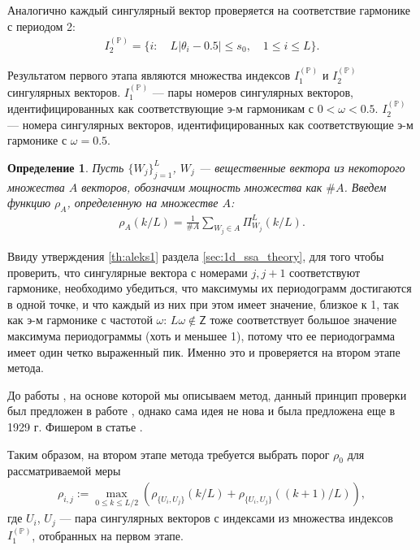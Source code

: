 \documentclass[specialist,
               substylefile = spbu.rtx,
               subf,href,colorlinks=true, 12pt]{disser}
\newtheorem{defn}{Определение}
\begin{document}
Аналогично каждый сингулярный вектор проверяется на соответствие гармонике с периодом 2:
\begin{gather} \label{eq:I_2_P}
I_2^{(\mathbb{P})} = \{i: \quad  L |\theta_{i} - 0.5 | \leqslant s_0, \quad 1 \leqslant i \leqslant L\}.
\end{gather}

Результатом первого этапа являются множества индексов $I_1^{(\mathbb{P})}$ и $I_2^{(\mathbb{P})}$ сингулярных векторов. $I_1^{(\mathbb{P})}$ --- пары номеров сингулярных векторов, идентифицированных как соответствующие э-м гармоникам с $0 < \omega < 0.5$.  $I_2^{(\mathbb{P})}$ --- номера сингулярных векторов, идентифицированных как соответствующие э-м гармонике с $\omega = 0.5$.

\begin{defn} \label{def:rho}
Пусть $\{W_j\}_{j=1}^{L}$, $W_j$ --- вещественные вектора из некоторого множества $A$ векторов, обозначим мощность множества как $\# A$. Введем функцию $\rho_A$, определенную на множестве $A$:
\begin{gather*}
\rho_{A}(k/L) = \frac{1}{\#A} \sum_{W_j \in A}{\Pi^{L}_{W_j}{(k/L)}}.
\end{gather*}
\end{defn}

Ввиду утверждения \ref{th:aleks1} раздела \ref{sec:1d_ssa_theory}, для того чтобы проверить, что сингулярные вектора с номерами $j, j + 1$ соответствуют гармонике, необходимо убедиться, что максимумы их периодограмм достигаются в одной точке, и что каждый из них при этом имеет значение, близкое к 1, так как э-м гармонике с частотой $\omega$: $L \omega \not \in \mathsf{Z}$ тоже соответствует большое значение максимума периодограммы (хоть и меньшее 1), потому что ее периодограмма имеет один четко выраженный пик.  Именно это и проверяется на втором этапе метода.

До работы \cite{Alexandrov2006}, на основе которой мы описываем метод, данный принцип проверки был предложен в работе \cite{Vautard1992}, однако сама идея не нова и была предложена еще в 1929 г. Фишером в статье \cite{Fisher1929}.

Таким образом, на втором этапе метода
 требуется выбрать порог $\rho_0$ для рассматриваемой меры
\begin{gather} \label{eq:rho_ij}
\rho_{i,j} := \max_{0 \leqslant k \leqslant L/2}{\left(\rho_{\{U_i,U_j\}}(k/L) + \rho_{\{U_i,U_j\}}((k+1)/L)\right)},
\end{gather}
где $U_i$, $U_j$ --- пара сингулярных векторов с индексами из множества индексов $I_1^{(\mathbb{P})}$, отобранных на первом этапе.
\end{document}
